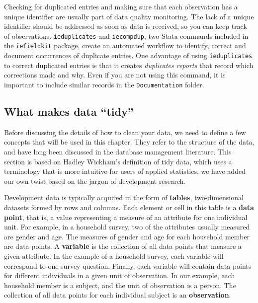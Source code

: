 Checking for duplicated entries and making sure that each observation has a unique identifier are usually part of data quality monitoring.
The lack of a unique identifier should be addressed as soon as data is received,
so you can keep track of observations.
\texttt{ieduplicates} and \texttt{iecompdup},
two Stata commands included in the \texttt{iefieldkit}
package,
create an automated workflow to identify, correct and document
occurrences of duplicate entries.
One advantage of using \texttt{ieduplicates} 
to correct duplicated entries is that it creates \textit{duplicates reports}
that record which corrections made and why.
Even if you are not using this command,
it is important to include similar records in the \texttt{Documentation} folder.

\subsection{What makes data ``tidy''}

Before discussing the details of how to clean your data,
we need to define a few concepts that will be used in this chapter.
They refer to the structure of the data,
and have long been discussed in the database management literature.
This section is based on Hadley Wickham's definition of tidy data,\cite{tidy-data}
which uses a terminology that is more intuitive for users of applied statistics,
we have added our own twist based on the jargon of development research.

Development data is typically acquired in the form of \textbf{tables},
two-dimensional datasets formed by rows and columns.
Each element or cell in this table is a \textbf{data point}, that is,
a value representing a measure of an attribute for one individual unit.
For example, in a household survey,
two of the attributes usually measured are gender and age.
The measures of gender and age for each household member are data points.
A \textbf{variable}
 is the collection of all data points that measure a given attribute.
In the example of a household survey,
each variable will correspond to one survey question.
Finally, each variable will contain data points for different individuals in a given unit of observation.
In our example, each household member is a subject, and the unit of observation is a person.
The collection of all data points for each individual subject is an 
\textbf{observation}.

